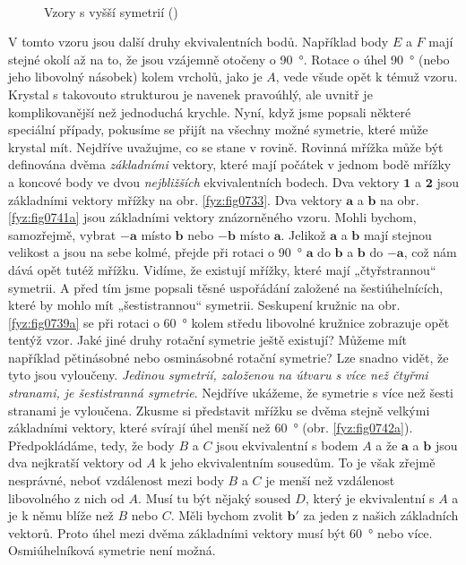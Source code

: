    \begin{figure}[ht!]    %
      \centering
                     \\
      \caption{Vzory s vyšší symetrií (\cite[s.~549]{Feynman02})}
      \label{fyz:fig0741}
    \end{figure}

    V tomto vzoru jsou další druhy ekvivalentních bodů. Například body \(E\) a \(F\) mají stejné 
    okolí až na to, že jsou vzájemně otočeny o \SI{90}{\degree}. Rotace o úhel \SI{90}{\degree} 
    (nebo jeho libovolný násobek) kolem vrcholů, jako je \(A\), vede všude opět k témuž vzoru. 
    Krystal s takovouto strukturou je navenek pravoúhlý, ale uvnitř je komplikovanější než 
    jednoduchá krychle. Nyní, když jsme popsali některé speciální případy, pokusíme se přijít na 
    všechny možné symetrie, které může krystal mít. Nejdříve uvažujme, co se stane v rovině. 
    Rovinná mřížka může být definována dvěma \emph{základními} vektory, které mají počátek v jednom 
    bodě mřížky a koncové body ve dvou \emph{nejbližších} ekvivalentních bodech. Dva vektory 
    \(\bm{1}\) a \(\bm{2}\) jsou základními vektory mřížky na obr. \ref{fyz:fig0733}. Dva vektory 
    \(\bm{a}\) a \(\bm{b}\) na obr. \ref{fyz:fig0741a} jsou základními vektory znázorněného vzoru. 
    Mohli bychom, samozřejmě, vybrat \(\bm{-a}\) místo \(\bm{b}\) nebo \(\bm{-b}\) místo 
    \(\bm{a}\). Jelikož \(\bm{a}\) a \(\bm{b}\) mají stejnou velikost a jsou na sebe kolmé, přejde 
    při rotaci o \SI{90}{\degree} \(\bm{a}\) do \(\bm{b}\) a \(\bm{b}\) do \(\bm{-a}\), což nám 
    dává opět tutéž mřížku. Vidíme, že existují mřížky, které mají „čtyřstrannou“ symetrii. A před 
    tím jsme popsali těsné uspořádání založené na šestiúhelnících, které by mohlo mít 
    „šestistrannou“ symetrii. Seskupení kružnic na obr. \ref{fyz:fig0739a} se při rotaci o 
    \SI{60}{\degree} kolem středu libovolné kružnice zobrazuje opět tentýž vzor. Jaké jiné druhy 
    rotační symetrie ještě existují? Můžeme mít například pětinásobné nebo osminásobné rotační 
    symetrie? Lze snadno vidět, že tyto jsou vyloučeny.\emph{ Jedinou symetrií, založenou na útvaru 
    s více než čtyřmi stranami, je šestistranná symetrie}. Nejdříve ukážeme, že symetrie s více než 
    šesti stranami je vyloučena. Zkusme si představit mřížku se dvěma stejně velkými základními 
    vektory, které svírají úhel menší než \SI{60}{\degree} (obr. \ref{fyz:fig0742a}). Předpokládáme, 
    tedy, že body \(B\) a \(C\) jsou ekvivalentní s bodem \(A\) a že \(\bm{a}\) a \(\bm{b}\) jsou 
    dva nejkratší vektory od \(A\) k jeho ekvivalentním sousedům. To je však zřejmě nesprávné, 
    neboť vzdálenost mezi body \(B\) a \(C\) je menší než vzdálenost libovolného z nich od \(A\). 
    Musí tu být nějaký soused \(D\), který je ekvivalentní s \(A\) a je k němu blíže než \(B\) nebo 
    \(C\). Měli bychom zvolit \(\bm{b'}\) za jeden z našich základních vektorů. Proto úhel mezi 
    dvěma základními vektory musí být \SI{60}{\degree} nebo více. Osmiúhelníková symetrie není 
    možná.

